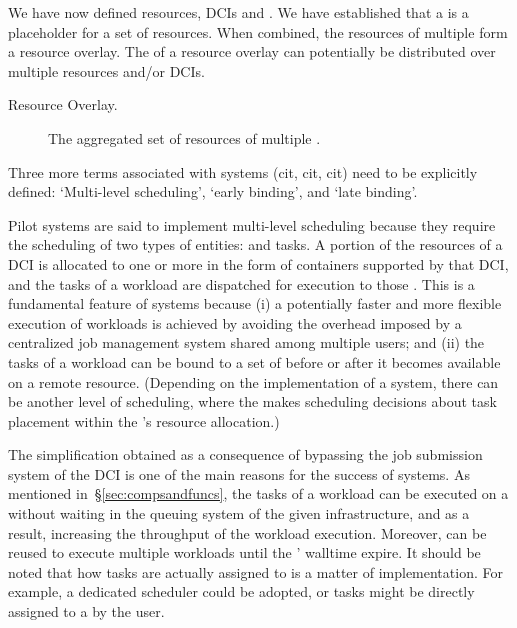 \documentclass{sig-alternate}
\begin{document}
We have now defined resources, DCIs and \pilots. We have established that a
\pilot is a placeholder for a set of resources. When combined, the resources of
multiple \pilots form a resource overlay. The \pilots of a resource overlay can
potentially be distributed over multiple resources and/or DCIs.


\begin{description}
\item[Resource Overlay.] The aggregated set of resources of multiple \pilots.
\end{description}

Three more terms associated with \pilot systems (cit, cit, cit) need to be
explicitly defined: `Multi-level scheduling', `early binding', and `late
binding'.

Pilot systems are said to implement multi-level scheduling because they require
the scheduling of two types of entities: \pilots and tasks. A portion of the
resources of a DCI is allocated to one or more \pilots in the form of
containers supported by that DCI, and the tasks of a workload are dispatched
for execution to those \pilots. This is a fundamental feature of \pilot systems
because (i) a potentially faster and more flexible execution of workloads is
achieved by avoiding the overhead imposed by a centralized job management
system shared among multiple users; and (ii) the tasks of a workload can be
bound to a set of \pilots before or after it becomes available on a remote
resource.  (Depending on the implementation of a \pilot system, there can be
another level of scheduling, where the \pilot makes scheduling decisions about
task placement within the \pilot's resource allocation.)

The simplification obtained as a consequence of bypassing the job submission
system of the DCI is one of the main reasons for the success of \pilot
systems. As mentioned in~\S\ref{sec:compsandfuncs}, the tasks of a workload can
be executed on a \pilot without waiting in the queuing system of the given
infrastructure, and as a result, increasing the throughput of the workload
execution. Moreover, \pilots can be reused to execute multiple workloads until
the \pilots' walltime expire.  It should be noted that how tasks are actually
assigned to \pilots is a matter of implementation. For example, a dedicated
scheduler could be adopted, or tasks might be directly assigned to a \pilot by
the user.
\end{document}

